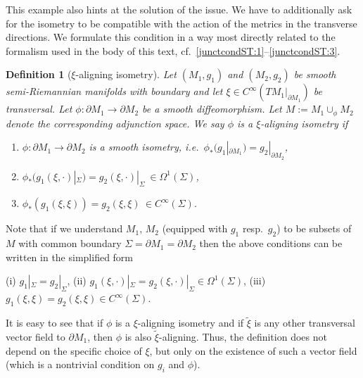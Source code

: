 \documentclass[11pt]{article}
\numberwithin{equation}{section}
\newtheorem{definition}[theorem]{Definition}
\begin{document}
This example also hints at the solution of the issue. We have to additionally ask for the isometry to be compatible with the action of the metrics in the transverse directions. We formulate this condition in a way most directly related to the formalism used in the body of this text, cf.\ \eqref{junctcondST:1}--\eqref{junctcondST:3}.

\begin{definition}[$\xi$-aligning isometry]\label{Definition: xialigningisometry}
Let $(M_1,g_1)$ and $(M_2,g_2)$ be smooth semi-Riemannian manifolds with boundary and let $\xi \in C^{\infty}(TM_1|_{\partial M_1})$ be transversal. Let $\phi: \partial M_1 \to \partial M_2$ be a smooth diffeomorphism. Let $M:=M_1 \cup_\phi M_2$ denote the corresponding adjunction space.
We say $\phi$ is a \emph{$\xi$-aligning isometry} if
\begin{enumerate}
        \item[(i)] $\phi: \partial M_1 \to \partial M_2$ is a smooth isometry, i.e.\ 
        $\phi_*(g_1|_{\partial M_1}) = g_2 |_{\partial M_2}$,
    \item[(ii)] $\phi_*(g_1(\xi,\cdot)|_{\Sigma}) = g_2(\xi,\cdot)|_\Sigma\ \in \Omega^1(\Sigma)$,
    \item[(iii)] $\phi_*(g_1(\xi,\xi)) = g_2(\xi,\xi)\ \in C^\infty(\Sigma)$.
   \end{enumerate}
\end{definition}

Note that if we understand $M_1$, $M_2$ (equipped with $g_1$ resp.\ $g_2$) to be subsets of $M$ with common boundary $\Sigma = \partial M_1 = \partial M_2$ then the above conditions can be written in the simplified form
\begin{center}
     (i)  $g_1 |_{\Sigma} = g_2|_{\Sigma}$,\quad
     (ii) $g_1(\xi,\cdot)|_{\Sigma} = g_2(\xi,\cdot)|_\Sigma \in \Omega^1(\Sigma)$,\quad
     (iii) $g_1(\xi,\xi) = g_2(\xi,\xi) \in C^\infty(\Sigma)$.
\end{center}

It is easy to see that if $\phi$ is a $\xi$-aligning isometry and if $\tilde{\xi}$ is any other transversal vector field to $\partial M_1$, then $\phi$ is also $\tilde{\xi}$-aligning. Thus, the definition does not depend on the specific choice of $\xi$, but only on the existence of such a vector field (which is a nontrivial condition on $g_i$ and $\phi$).
\end{document}
